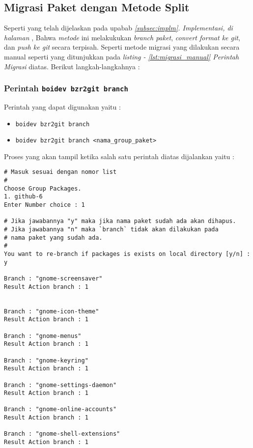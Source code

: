 {\subsection{Migrasi Paket dengan \textbf{Metode Split}}
\label{implm_4}
\noindent
Seperti yang telah dijelaskan pada upabab \textit{\ref{subsec:implm}. Implementasi, di halaman \pageref{itm:metode_split}}, Bahwa \textit{metode} ini melakukukan \textit{branch paket}, \textit{convert format ke git}, dan \textit{push ke git} secara terpisah. Seperti metode migrasi yang dilakukan secara manual seperti yang ditunjukkan pada \textit{listing - \ref{lst:migrasi_manual} Perintah Migrasi} diatas. Berikut langkah-langkahnya :

\subsubsection{Perintah {\small \texttt{boidev bzr2git branch}}}
\noindent
Perintah yang dapat digunakan yaitu :
\begin{itemize}
	\item {\small \texttt{boidev bzr2git branch}}
	\item {\small \texttt{boidev bzr2git branch <nama\_group\_paket>}}
\end{itemize}

\noindent
Proses yang akan tampil ketika salah satu perintah diatas dijalankan yaitu :

\begin{lstlisting}[language=ShellBash2]
# Masuk sesuai dengan nomor list
#
Choose Group Packages.
1. github-6
Enter Number choice : 1

# Jika jawabannya "y" maka jika nama paket sudah ada akan dihapus.
# Jika jawabannya "n" maka `branch` tidak akan dilakukan pada 
# nama paket yang sudah ada.
#
You want to re-branch if packages is exists on local directory [y/n] : y

Branch : "gnome-screensaver"
Result Action branch : 1


Branch : "gnome-icon-theme"
Result Action branch : 1

Branch : "gnome-menus"
Result Action branch : 1

Branch : "gnome-keyring"
Result Action branch : 1

Branch : "gnome-settings-daemon"
Result Action branch : 1

Branch : "gnome-online-accounts"
Result Action branch : 1

Branch : "gnome-shell-extensions"
Result Action branch : 1


\end{lstlisting}}

